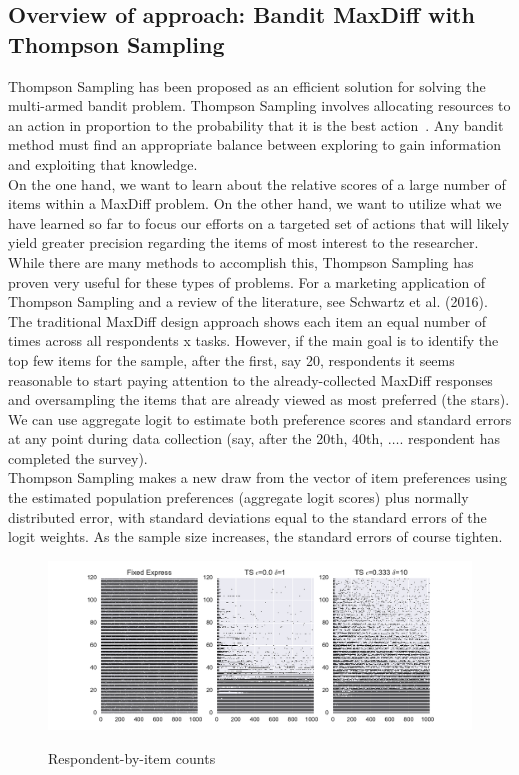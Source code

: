 \documentclass[nonblindrev]{informs3}
\begin{document}
\subsection{Overview of approach: Bandit MaxDiff with Thompson Sampling}
Thompson Sampling has been proposed as an efficient solution for solving the multi-armed bandit problem. Thompson Sampling involves allocating resources to an action in proportion to the probability that it is the best action~\cite{thompson1933likelihood}. Any bandit method must find an appropriate balance between exploring to gain information and exploiting that knowledge.\\
On the one hand, we want to learn about the relative scores of a large number of items within a MaxDiff problem. On the other hand, we want to utilize what we have learned so far to focus our efforts on a targeted set of actions that will likely yield greater precision regarding the items of most interest to the researcher. While there are many methods to accomplish this, Thompson Sampling has proven very useful for these types of problems. For a marketing application of Thompson Sampling and a review of the literature, see Schwartz et al. (2016). \\
The traditional MaxDiff design approach shows each item an equal number of times across all respondents x tasks.  However, if the main goal is to identify the top few items for the sample, after the first, say 20, respondents it seems reasonable to start paying attention to the already-collected MaxDiff responses and oversampling the items that are already viewed as most preferred (the stars).  We can use aggregate logit to estimate both preference scores and standard errors at any point during data collection (say, after the 20th, 40th, $\ldots$. respondent has completed the survey).\\
Thompson Sampling makes a new draw from the vector of item preferences using the estimated population preferences (aggregate logit scores) plus normally distributed error, with standard deviations equal to the standard errors of the logit weights.  As the sample size increases, the standard errors of course tighten.\\
\begin{figure}[!ht]
\caption{Respondent-by-item counts}
\includegraphics[width=1\textwidth]{plots/3dotplot.pdf}
\label{fig:dots}
\end{figure}
\end{document}
